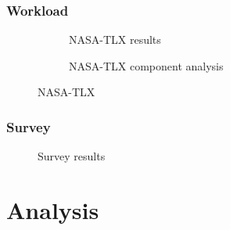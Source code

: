   \subsection{Workload}
  \begin{figure}[h]
    \centering
    \begin{subfigure}[b]{0.45\textwidth}
      \ifdraft{}{}
      \label{fig:results}
      \caption{NASA-TLX results}
    \end{subfigure}
    \hfill
    \begin{subfigure}[b]{0.45\textwidth}
      \ifdraft{}{}
      \label{fig:tlx_components}
      \caption{NASA-TLX component analysis}
    \end{subfigure}
    \label{fig:tlx}
    \caption{NASA-TLX}
  \end{figure}


  \subsection{Survey}
  \begin{figure}[h]
    \centering
    \ifdraft{}{}
    \label{fig:survey}
    \caption{Survey results}
  \end{figure}


\chapter{Analysis}

